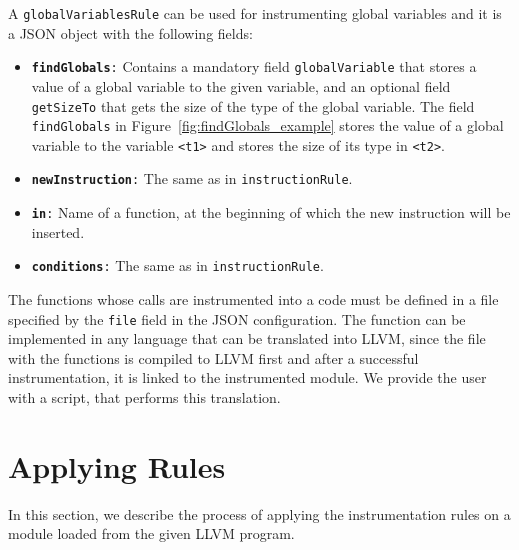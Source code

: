 \noindent A \texttt{globalVariablesRule} can be used for instrumenting global
variables and it is a JSON object with the following fields:
\begin{itemize}
    \item \texttt{\textbf{findGlobals}:} Contains a mandatory field
    \texttt{globalVariable} that stores a value of a global variable to the
    given variable, and an optional field \texttt{getSizeTo} that gets the size
    of the type of the global variable. The field \texttt{findGlobals} in
    Figure~\ref{fig:findGlobals_example} stores the value of a global variable
    to the variable \texttt{<t1>} and stores the size of its type in
    \texttt{<t2>}.

    \begin{minipage}{\linewidth}
        
        \label{fig:findGlobals_example}
      \end{minipage}

    \item \texttt{\textbf{newInstruction}:} The same as in \texttt{instructionRule}.
    \item \texttt{\textbf{in}:} Name of a function, at the beginning of which the new
    instruction will be inserted.
    \item \texttt{\textbf{conditions}:} The same as in \texttt{instructionRule}.
\end{itemize}

The functions whose calls are instrumented into a code must be defined in a
file specified by the \texttt{file} field in the JSON configuration. The
function can be implemented in any language that can be translated into LLVM,
since the file with the functions is compiled to LLVM first and after a
successful instrumentation, it is linked to the instrumented module. We provide
the user with a script, that performs this translation.

\section{Applying Rules}

In this section, we describe the process of applying the instrumentation
rules on a module loaded from the given LLVM program.

